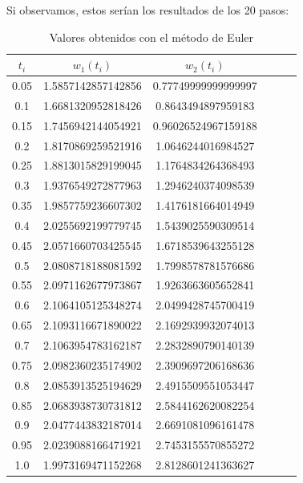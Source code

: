 \documentclass[12pt]{article}       %
\begin{document}
Si observamos, estos serían los resultados de los 20 pasos:

\begin{table}[H]
	\centering
	\setlength\extrarowheight{2.5pt}
	
	\begin{tabular}{|c|c|c|c|c|c}
		\hline
		\textbf{$t_i$} & {\textbf{$w_1(t_i)$}} & {\textbf{$w_2(t_i)$}}\\ 
		\hline
	     0.05 & 1.5857142857142856 & 0.77749999999999997 \\
		\hline
		  0.1 & 1.6681320952818426 & 0.8643494897959183 \\
		\hline
		 0.15 & 1.7456942144054921 & 0.96026524967159188 \\
		\hline
	     0.2 & 1.8170869259521916 & 1.0646244016984527 \\
		\hline
		 0.25 & 1.8813015829199045 & 1.1764834264368493 \\
		\hline
		  0.3 & 1.9376549272877963 & 1.2946240374098539  \\
		\hline
		 0.35 & 1.9857759236607302 & 1.4176181664014949  \\
		\hline
		  0.4 & 2.0255692199779745 & 1.5439025590309514  \\
		\hline
		 0.45 & 2.0571660703425545 & 1.6718539643255128 \\
		\hline
		  0.5 & 2.0808718188081592 & 1.7998578781576686  \\
		\hline
		 0.55 & 2.0971162677973867 & 1.9263663605652841  \\
		\hline
		  0.6 & 2.1064105125348274 & 2.0499428745700419  \\
		\hline
		 0.65 & 2.1093116671890022 & 2.1692939932074013  \\
		\hline
		  0.7 & 2.1063954783162187 & 2.2832890790140139 \\
		\hline
		 0.75 & 2.0982360235174902 & 2.3909697206168636  \\
		\hline
		  0.8 & 2.0853913525194629 & 2.4915509551053447  \\
		\hline
		 0.85 & 2.0683938730731812 & 2.5844162620082254  \\
		\hline
		  0.9 & 2.0477443832187014 & 2.6691081096161478  \\
		\hline
		 0.95 & 2.0239088166471921 & 2.7453155570855272  \\
		\hline
		  1.0 & 1.9973169471152268 & 2.8128601241363627  \\
		\hline
	\end{tabular}
	
	\caption{Valores obtenidos con el método de Euler}           
\end{table}
\end{document}
